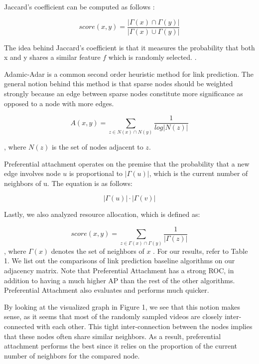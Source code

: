 \documentclass[10pt,twocolumn,letterpaper]{article}
\begin{document}
Jaccard's coefficient can be computed as follows \cite{link-prediction-social-network}:

\[
score(x, y) = \frac{|\Gamma(x) \cap \Gamma(y)| }{|\Gamma(x) \cup \Gamma(y)| }
\]

The idea behind Jaccard's coefficient is that it measures the probability that both x and y shares a similar feature $f$ which is randomly selected. \cite{link-prediction-social-network}.


Adamic-Adar is a common second order heuristic method for link prediction. The general notion behind this method is that sparse nodes should be weighted strongly because an edge between sparse nodes constitute more significance as opposed to a node with more edges. \cite{link-prediction-social-network} 


\[
    A(x, y) = \displaystyle\sum_{z \in N(x) \cap N(y)}^{} \frac{1}{log|N(z)|} 
\]

, where $N(z)$ is the set of nodes adjacent to $z$. \cite{link-prediction-social-network}

Preferential attachment operates on the premise that the probability that a new edge involves node $u$ is proportional to $|\Gamma(u)|$, which is the current number of neighbors of u. The equation is as follows:   

\[
    |\Gamma(u)|\cdot|\Gamma(v)|
\]

Lastly, we also analyzed resource allocation, which is defined as:

\[
    score(x, y) = \displaystyle\sum_{z \in \Gamma(x) \cap \Gamma(y)}^{} \frac{1}{|\Gamma(z)|} 
\]
, where $\Gamma(x)$ denotes the set of neighbors of $x$
.
For our results, refer to Table 1. We list out the comparisons of link prediction baseline algorithms on our adjacency matrix. Note that Preferential Attachment has a strong ROC, in addition to having a much higher AP than the rest of the other algorithms. Preferential Attachment also evaluates and performs much quicker. 

By looking at the visualized graph in Figure 1, we see that this notion makes sense, as it seems that most of the randomly sampled videos are closely inter-connected with each other. This tight inter-connection between the nodes implies that these nodes often share similar neighbors. As a result, preferential attachment performs the best since it relies on the proportion of the current number of neighbors for the compared node.
\end{document}

